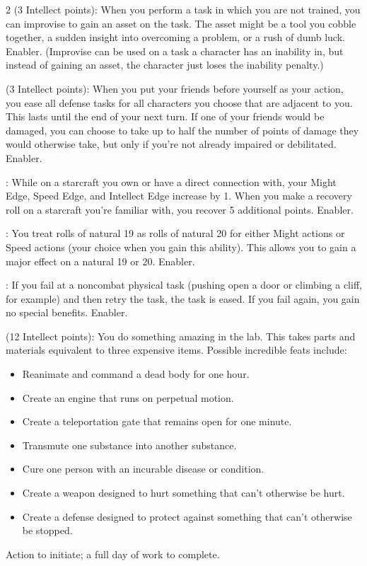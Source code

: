 \begin{multicols}{2}
 (3 Intellect points): When you perform a task in which you are not trained, you can improvise to gain an asset on the task. The asset might be a tool you cobble together, a sudden insight into overcoming a problem, or a rush of dumb luck. Enabler. (Improvise can be used on a task a character has an inability in, but instead of gaining an asset, the character just loses the inability penalty.)
 
 (3 Intellect points): When you put your friends before yourself as your action, you ease all defense tasks for all characters you choose that are adjacent to you. This lasts until the end of your next turn. If one of your friends would be damaged, you can choose to take up to half the number of points of damage they would otherwise take, but only if you’re not already impaired or debilitated. Enabler. 
 
: While on a starcraft you own or have a direct connection with, your Might Edge, Speed Edge, and Intellect Edge increase by 1. When you make a recovery roll on a starcraft you’re familiar with, you recover 5 additional points. Enabler. 
 
: You treat rolls of natural 19 as rolls of natural 20 for either Might actions or Speed actions (your choice when you gain this ability). This allows you to gain a major effect on a natural 19 or 20. Enabler. 
 
: If you fail at a noncombat physical task (pushing open a door or climbing a cliff, for example) and then retry the task, the task is eased. If you fail again, you gain no special benefits. Enabler. 
 
 (12 Intellect points): You do something amazing in the lab. This takes parts and materials equivalent to three expensive items. Possible incredible feats include: 

\begin{itemize} 
\item Reanimate and command a dead body for one hour. 
\item Create an engine that runs on perpetual motion. 
\item Create a teleportation gate that remains open for one minute. 
\item Transmute one substance into another substance. 
\item Cure one person with an incurable disease or condition. 
\item Create a weapon designed to hurt something that can’t otherwise be hurt. 
\item Create a defense designed to protect against something that can’t otherwise be stopped. 
\end{itemize}
Action to initiate; a full day of work to complete.
 

\end{multicols}
